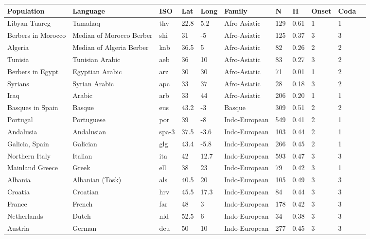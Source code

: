 \documentclass{article}
\begin{document}
\begin{longtable}{| p{} | p{} | p{} | p{} | p{} | p{} | p{} | p{} | p{} | p{} |p{} } 
  \hline
Population & Language & ISO & Lat & Long & Family & N & H & Onset & Coda \\ 
  \hline
Libyan Tuareg & Tamahaq & thv & 22.8 & 5.2 & Afro-Asiatic & 129 & 0.61 & 1 & 1 \\ 
  Berbers in Morocco & Median of Morocco Berber & shi & 31 & -5 & Afro-Asiatic & 125 & 0.37 & 3 & 3 \\ 
  Algeria & Median of Algeria Berber & kab & 36.5 & 5 & Afro-Asiatic & 82 & 0.26 & 2 & 2 \\ 
  Tunisia & Tunisian Arabic & aeb & 36 & 10 & Afro-Asiatic & 83 & 0.27 & 3 & 2 \\ 
  Berbers in Egypt & Egyptian Arabic & arz & 30 & 30 & Afro-Asiatic & 71 & 0.01 & 1 & 2 \\ 
  Syrians & Syrian Arabic & apc & 33 & 37 & Afro-Asiatic & 28 & 0.18 & 3 & 2 \\ 
  Iraq & Arabic & arb & 33 & 44 & Afro-Asiatic & 206 & 0.20 & 1 & 1 \\ 
  Basques in Spain & Basque & eus & 43.2 & -3 & Basque & 309 & 0.51 & 2 & 2 \\ 
  Portugal & Portuguese & por & 39 & -8 & Indo-European & 549 & 0.41 & 2 & 1 \\ 
  Andalusia & Andalusian & spa-3 & 37.5 & -3.6 & Indo-European & 103 & 0.44 & 2 & 1 \\ 
  Galicia, Spain & Galician & glg & 43.4 & -5.8 & Indo-European & 266 & 0.45 & 2 & 1 \\ 
  Northern Italy & Italian & ita & 42 & 12.7 & Indo-European & 593 & 0.47 & 3 & 3 \\ 
  Mainland Greece & Greek & ell & 38 & 23 & Indo-European & 79 & 0.42 & 3 & 1 \\ 
  Albania & Albanian (Tosk) & als & 40.5 & 20 & Indo-European & 105 & 0.49 & 3 & 3 \\ 
  Croatia & Croatian & hrv & 45.5 & 17.3 & Indo-European & 84 & 0.44 & 3 & 3 \\ 
  France & French & far & 48 & 3 & Indo-European & 178 & 0.42 & 3 & 3 \\ 
  Netherlands & Dutch & nld & 52.5 & 6 & Indo-European & 34 & 0.38 & 3 & 3 \\ 
  Austria & German & deu & 50 & 10 & Indo-European & 277 & 0.45 & 3 & 3 \\ 

\end{longtable}
\end{document}
